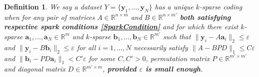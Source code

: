 \documentclass[journal, onecolumn]{IEEEtran}
\newtheorem{definition}{Definition}
\begin{document}
\begin{definition}
We say a dataset $Y = \{\mathbf{y}_1, \ldots, \mathbf{y}_N\}$ has a unique $k$-sparse coding when for any pair of matrices $A \in \mathbb{R}^{n \times m}$ and $B \in \mathbb{R}^{n \times m'}$ \textbf{both satisfying respective spark conditions \eqref{SparkCondition}} and for which there exist $k$-sparse $\mathbf{a}_1, \ldots, \mathbf{a}_N \in \mathbb{R}^m$ and $k$-sparse $\mathbf{b}_1, \ldots, \mathbf{b}_N \in \mathbb{R}^{m'}$ such that $\|\mathbf{y}_i - A\mathbf{a}_i\|_2 \leq \varepsilon$  and $\|\mathbf{y}_i - B\mathbf{b}_i\|_2 \leq \varepsilon$ for all $i = 1, \ldots, N$ necessarily satisfy $\|A - BPD\|_1 \leq C\varepsilon$ and $\|\mathbf{b}_i - PD\mathbf{a}_i\|_1 < C'\varepsilon$ for some $C, C' > 0$, permutation matrix $P \in \mathbb{R}^{m' \times m'}$ and diagonal matrix $D \in \mathbb{R}^{m' \times m}$, \textbf{provided $\varepsilon$ is small enough}.
\end{definition}
\end{document}
